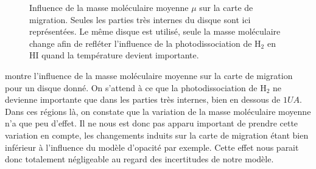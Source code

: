 \begin{figure}[htb]
\centering
{}\hfill
{}
\caption{Influence de la masse moléculaire moyenne $\mu$ sur la carte de migration. Seules les
parties très internes du disque sont ici représentées. Le même disque est utilisé, seule la masse
moléculaire change afin de refléter l'influence de la photodissociation de $\mathrm{H_2}$ en
$\mathrm{HI}$ quand la température devient importante. }\label{fig:migration_map_mmw}
\end{figure}

 montre l'influence de la masse moléculaire moyenne sur la carte de migration pour un disque
donné. On s'attend à ce que la photodissociation de $\mathrm{H_2}$ ne devienne importante que dans les parties très internes,
bien en dessous de $1\unit{UA}$. Dans ces régions là, on constate que la variation de la masse moléculaire moyenne n'a que peu
d'effet. Il ne nous est donc pas apparu important de prendre cette variation en compte, les changements induits sur la carte de
migration étant bien inférieur à l'influence du modèle d'opacité par exemple. Cette effet nous parait donc totalement
négligeable au regard des incertitudes de notre modèle.
